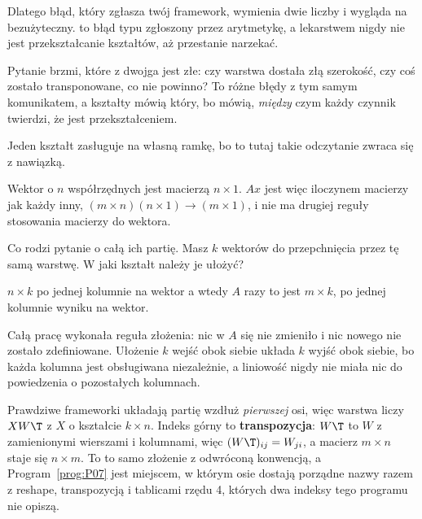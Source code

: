 
\begin{fr}
\begin{aibox}
Dlatego błąd, który zgłasza twój framework, wymienia dwie liczby i wygląda na
bezużyteczny.  to błąd typu zgłoszony przez arytmetykę, a lekarstwem nigdy nie jest
przekształcanie kształtów, aż przestanie narzekać.

Pytanie brzmi, które z dwojga jest złe: czy warstwa dostała złą szerokość, czy
coś zostało transponowane, co nie powinno? To różne błędy z tym samym
komunikatem, a kształty mówią który, bo mówią, \emph{między} czym każdy czynnik
twierdzi, że jest przekształceniem.
\end{aibox}
\end{fr}

\begin{fr}
Jeden kształt zasługuje na własną ramkę, bo to tutaj takie odczytanie zwraca
się z nawiązką.

Wektor o $n$ współrzędnych jest macierzą $n \times 1$. $Ax$ jest więc iloczynem
macierzy jak każdy inny, $(m \times n)(n \times 1) \to (m \times 1)$, i nie ma
drugiej reguły stosowania macierzy do wektora.

Co rodzi pytanie o całą ich partię. Masz $k$ wektorów do przepchnięcia przez tę
samą warstwę. W jaki kształt należy je ułożyć?
\dotline
\nextframe
\end{fr}

\begin{fr}
\begin{ansblock}
$n \times k$ \dash{} po jednej kolumnie na wektor \dash{} a wtedy $A$ razy to
jest $m \times k$, po jednej kolumnie wyniku na wektor.
\end{ansblock}

Całą pracę wykonała reguła złożenia: nic w $A$ się nie zmieniło i nic nowego
nie zostało zdefiniowane. Ułożenie $k$ wejść obok siebie układa $k$ wyjść obok
siebie, bo każda kolumna jest obsługiwana niezależnie, a liniowość nigdy nie
miała nic do powiedzenia o pozostałych kolumnach.

\begin{note}
Prawdziwe frameworki układają partię wzdłuż \emph{pierwszej} osi, więc warstwa
liczy $XW\T$ z $X$ o kształcie $k \times n$. Indeks górny to
\textbf{transpozycja}: $W\T$ to $W$ z zamienionymi wierszami i kolumnami, więc
$(W\T)_{ij} = W_{ji}$, a macierz $m \times n$ staje się $n \times m$. To to samo
złożenie z odwróconą konwencją, a Program~\ref{prog:P07} jest miejscem, w
którym osie dostają
porządne nazwy \dash{} razem z reshape, transpozycją i tablicami rzędu 4,
których dwa indeksy tego programu nie opiszą.
\end{note}
\end{fr}

